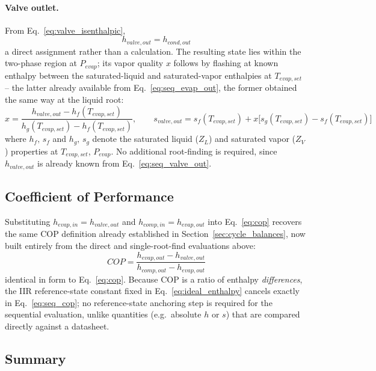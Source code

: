 \documentclass{article}
\begin{document}
\paragraph{Valve outlet.} From Eq.~\eqref{eq:valve_isenthalpic},
\begin{equation}\label{eq:seq_valve_out}
    h_{valve,out} = h_{cond,out}
\end{equation}
a direct assignment rather than a calculation. The resulting state lies
within the two-phase region at $P_{evap}$; its vapor quality $x$ follows
by flashing at known enthalpy between the saturated-liquid and
saturated-vapor enthalpies at $T_{evap,set}$ -- the latter already
available from Eq.~\eqref{eq:seq_evap_out}, the former obtained the same
way at the liquid root:
\begin{equation}\label{eq:seq_quality}
    x = \frac{h_{valve,out} - h_{f}(T_{evap,set})}{h_{g}(T_{evap,set}) - h_{f}(T_{evap,set})}, \qquad
    s_{valve,out} = s_f(T_{evap,set}) + x\big[s_g(T_{evap,set}) - s_f(T_{evap,set})\big]
\end{equation}
where $h_f,\,s_f$ and $h_g,\,s_g$ denote the saturated liquid ($Z_L$) and
saturated vapor ($Z_V$) properties at $T_{evap,set}$, $P_{evap}$. No
additional root-finding is required, since $h_{valve,out}$ is already
known from Eq.~\eqref{eq:seq_valve_out}.

\subsection{Coefficient of Performance}\label{sec:seq_cop}

Substituting $h_{evap,in}=h_{valve,out}$ and
$h_{comp,in}=h_{evap,out}$ into Eq.~\eqref{eq:cop} recovers the same COP
definition already established in Section~\ref{sec:cycle_balances}, now
built entirely from the direct and single-root-find evaluations above:
\begin{equation}\label{eq:seq_cop}
    COP = \frac{h_{evap,out} - h_{valve,out}}{h_{comp,out} - h_{evap,out}}
\end{equation}
identical in form to Eq.~\eqref{eq:cop}. Because COP is a ratio of
enthalpy \emph{differences}, the IIR reference-state constant fixed in
Eq.~\eqref{eq:ideal_enthalpy} cancels exactly in
Eq.~\eqref{eq:seq_cop}; no reference-state anchoring step is required for
the sequential evaluation, unlike quantities (e.g.\ absolute $h$ or $s$)
that are compared directly against a datasheet.

\subsection{Summary}\label{sec:seq_summary}
\end{document}
